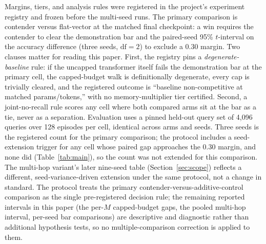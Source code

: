 Margins, tiers, and analysis rules were registered in the project's
experiment registry and frozen before the multi-seed runs. The primary
comparison is contender versus flat-vector at the matched final
checkpoint: a win requires the contender to clear the demonstration bar
and the paired-seed 95\% $t$-interval on the accuracy difference (three
seeds, $\mathrm{df}=2$) to exclude a 0.30 margin. Two clauses matter for
reading this paper. First, the registry pins a \emph{degenerate-baseline}
rule: if the uncapped transformer itself fails the demonstration bar at
the primary cell, the capped-budget walk is definitionally degenerate,
every cap is trivially cleared, and the registered outcome is ``baseline
non-competitive at matched params/tokens,'' with no memory-multiplier tier
certified. Second, a joint-no-recall rule scores any cell where both
compared arms sit at the bar as a tie, never as a separation. Evaluation
uses a pinned held-out query set of 4{,}096 queries over 128 episodes per
cell, %
identical across arms and seeds. Three seeds is the registered count for
the primary comparison; the protocol includes a seed-extension trigger
for any cell whose paired gap approaches the 0.30 margin, and none did
(Table~\ref{tab:main}), %
so the count was not extended for this comparison. The multi-hop
variant's later nine-seed table (Section~\ref{sec:scope}) reflects a
different, seed-variance-driven extension under the same protocol, not a
change in standard. The protocol treats the primary
contender-versus-additive-control comparison as the single
pre-registered decision rule; the remaining reported intervals in this
paper (the per-$M$ capped-budget gaps, the pooled multi-hop interval,
per-seed bar comparisons) are descriptive and diagnostic rather than
additional hypothesis tests, so no multiple-comparison correction is
applied to them.
